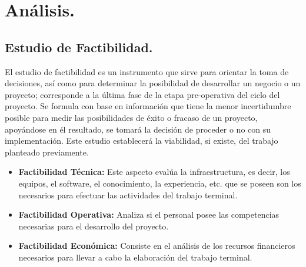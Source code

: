 \documentclass[12pt, a4paper, titlepage]{report}
\begin{document}

    
	\chapter{\textcolor{azulescom}{Análisis.}}
	    
    	\section{Estudio de Factibilidad.}
    	El estudio de factibilidad es un instrumento que sirve para orientar la toma de decisiones, así como para determinar la posibilidad de desarrollar un negocio o un proyecto; corresponde a la última fase de la etapa pre-operativa del ciclo del proyecto. Se formula con base en información que tiene la menor incertidumbre posible para medir las posibilidades de éxito o fracaso de un proyecto, apoyándose en él resultado, se tomará la decisión de proceder o no con su implementación. Este estudio establecerá la viabilidad, si existe, del trabajo planteado previamente.
    	\begin{itemize}
    		\item \textbf{Factibilidad Técnica:} Este aspecto evalúa la infraestructura, es decir, los equipos, el software, el conocimiento, la experiencia, etc. que se poseen son los necesarios para efectuar las actividades del trabajo terminal.
    		\item \textbf{Factibilidad Operativa:} Analiza si el personal posee las competencias necesarias para el desarrollo del proyecto.
    		\item \textbf{Factibilidad Econ\'omica:} Consiste en el análisis de los recursos financieros necesarios para llevar a cabo la elaboraci\'on del trabajo terminal.
    	\end{itemize}
\end{document}
